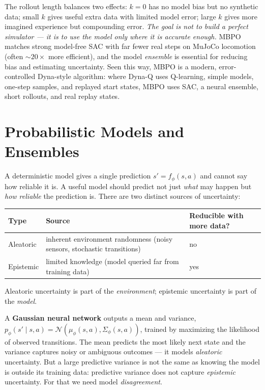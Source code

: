 \documentclass[11pt, oneside]{book}
\newcommand{\Normal}{\mathcal{N}}
\begin{document}
The rollout length balances two effects: $k=0$ has no model bias but no synthetic data;
small $k$ gives useful extra data with limited model error; large $k$ gives more imagined
experience but compounding error. \emph{The goal is not to build a perfect simulator --- it
is to use the model only where it is accurate enough.} MBPO matches strong model-free SAC
with far fewer real steps on MuJoCo locomotion (often $\sim 20\times$ more efficient), and
the model \emph{ensemble} is essential for reducing bias and estimating uncertainty. Seen
this way, MBPO is a modern, error-controlled Dyna-style algorithm: where Dyna-Q uses
Q-learning, simple models, one-step samples, and replayed start states, MBPO uses SAC, a
neural ensemble, short rollouts, and real replay states.

\section{Probabilistic Models and Ensembles}

A deterministic model gives a single prediction $s' = f_\phi(s,a)$ and cannot say how
reliable it is. A useful model should predict not just \emph{what} may happen but \emph{how
reliable} the prediction is. There are two distinct sources of uncertainty:

\begin{center}
\begin{tabular}{@{}lll@{}}
\toprule
\textbf{Type} & \textbf{Source} & \textbf{Reducible with more data?} \\
\midrule
Aleatoric & inherent environment randomness (noisy sensors, stochastic transitions) & no \\
Epistemic & limited knowledge (model queried far from training data) & yes \\
\bottomrule
\end{tabular}
\end{center}
Aleatoric uncertainty is part of the \emph{environment}; epistemic uncertainty is part of
the \emph{model}.

A \textbf{Gaussian neural network} outputs a mean and variance,
$p_\phi(s'\mid s,a) = \Normal(\mu_\phi(s,a), \Sigma_\phi(s,a))$, trained by maximizing the
likelihood of observed transitions. The mean predicts the most likely next state and the
variance captures noisy or ambiguous outcomes --- it models \emph{aleatoric} uncertainty.
But a large predictive variance is not the same as knowing the model is outside its
training data: predictive variance does not capture \emph{epistemic} uncertainty. For that
we need model \emph{disagreement}.
\end{document}
